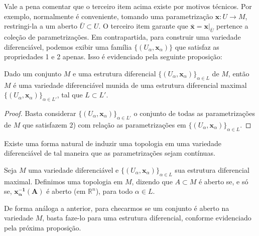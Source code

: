 Vale a pena comentar que o terceiro item acima existe por motivos técnicos. Por exemplo, normalmente é conveniente, tomando uma parametrização $\mathbf{x}:U\to M$, restringi-la a um aberto $\bar{U}\subset U$. O terceiro item garante que $\bar{\mathbf{x}}=\mathbf{x}|_{\overline{U}}$ pertence a coleção de parametrizações. Em contrapartida, para construir uma variedade diferenciável, podemos exibir uma família $\{ (U_{\alpha}, \mathbf{x}_{\alpha}) \}$ que satisfaz as propriedades 1 e 2 apenas. Isso é evidenciado pela seguinte proposição:
\begin{proposition}
    \label{loc:2.1_:_def_1_:_variedade_diferenciável.proposição_1}
    Dado um conjunto $M$ e uma estrutura diferencial $\{ (U_{\alpha}, \mathbf{x}_{\alpha}) \}_{\alpha \in L}$ de $M$, então $M$ é uma variedade diferenciável munida de uma estrutura diferencial maximal $\{ (U_{\alpha}, \mathbf{x}_{\alpha}) \}_{\alpha \in L'}$, tal que $L \subset L'$.
    \begin{proof}

        Basta considerar $\{ (U_{\alpha}, \mathbf{x}_{\alpha}) \}_{\alpha \in L'}$ o conjunto de todas as parametrizações de $M$ que satisfazem $2$) com relação as parametrizações em $\{ (U_{\alpha}, \mathbf{x}_{\alpha}) \}_{\alpha \in L}$.
    \end{proof}
\end{proposition}
Existe uma forma natural de induzir uma topologia em uma variedade diferenciável de tal maneira que as parametrizações sejam contínuas.
\begin{definition}
    \label{loc:2.1_:_def_1_:_variedade_diferenciável.topologia_induzida}
    Seja $M$ uma variedade diferenciável e $\{ (U_{\alpha}, \mathbf{x}_{\alpha}) \}_{\alpha \in L}$ sua estrutura diferencial maximal. Definimos uma topologia em $M$, dizendo que $A \subset M$ é aberto se, e só se, $\mathbf{x_{\alpha}^{-1}(A)}$ é aberto (em $\mathbb{R}^{n}$), para todo $\alpha \in L$.
\end{definition}
De forma análoga a anterior, para checarmos se um conjunto é aberto na variedade $M$, basta faze-lo para uma estrutura diferencial, conforme evidenciado pela próxima proposição.
